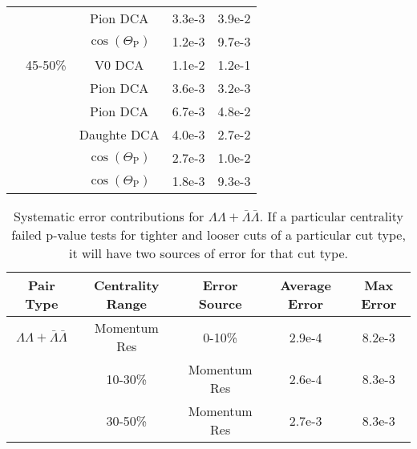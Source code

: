 \begin{table}
\begin{center}
\begin{tabular}{| c | c | c | c | c |}
   &         & Pion DCA & 3.3e-3 & 3.9e-2 \\
   &         & $\cos(\Theta_{\mathrm{P}})$ & 1.2e-3 & 9.7e-3 \\
   & 45-50\% & V0 DCA & 1.1e-2 & 1.2e-1 \\
   &         & Pion DCA & 3.6e-3 & 3.2e-3 \\
   &         & Pion DCA & 6.7e-3 & 4.8e-2 \\
   &         & Daughte DCA & 4.0e-3 & 2.7e-2 \\
   &         & $\cos(\Theta_{\mathrm{P}})$ & 2.7e-3 & 1.0e-2 \\
   &         & $\cos(\Theta_{\mathrm{P}})$ & 1.8e-3 & 9.3e-3 \\
   \hline
\end{tabular}
\end{center}
\end{table}
\begin{table}
\caption[Systematic error contributions for $\Lambda\Lambda + \bar{\Lambda}\bar{\Lambda}$] {Systematic error contributions for $\Lambda\Lambda + \bar{\Lambda}\bar{\Lambda}$.  
If a particular centrality failed p-value tests for tighter and looser cuts of a particular cut type, it will have two sources of error for that cut type.} \label{tab:SysErrorSourcesLLAA} 
\begin{center}
\begin{tabular}{| c | c | c | c | c |}
  \hline                       
  Pair Type & Centrality Range & Error Source & Average Error & Max Error \\
  \hline
  $\Lambda\Lambda + \bar{\Lambda}\bar{\Lambda}$ & Momentum Res & 0-10\% & 2.9e-4 & 8.2e-3 \\
   & 10-30\% & Momentum Res & 2.6e-4 & 8.3e-3 \\
   & 30-50\% & Momentum Res & 2.7e-3 & 8.3e-3 \\
  \hline
\end{tabular}
\end{center}
\end{table}
